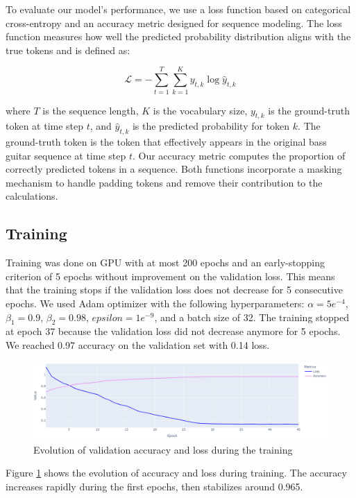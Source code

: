 To evaluate our model's performance, we use a loss function based on categorical cross-entropy and an accuracy metric designed for sequence modeling.
The loss function measures how well the predicted probability distribution aligns with the true tokens and is defined as:  

\begin{equation} \label{eq:loss}
    \mathcal{L} = - \sum_{t=1}^{T} \sum_{k=1}^{K} y_{t,k} \log \hat{y}_{t,k}
\end{equation}
    
where \( T \) is the sequence length, \( K \) is the vocabulary size, \( y_{t,k} \) is the ground-truth token at time step \( t \), and \( \hat{y}_{t,k} \) is the predicted probability for token \( k \).
The ground-truth token is the token that effectively appears in the original bass guitar sequence at time step \( t \).
Our accuracy metric computes the proportion of correctly predicted tokens in a sequence.
Both functions incorporate a masking mechanism to handle padding tokens and remove their contribution to the calculations.


\subsection{Training}

Training was done on GPU with at most 200 epochs and an early-stopping criterion of 5 epochs without improvement on the validation loss.
This means that the training stops if the validation loss does not decrease for 5 consecutive epochs.
We used Adam optimizer with the following hyperparameters: $\alpha=5e^{-4}$, $\beta_1=0.9$, $\beta_2=0.98$, $epsilon=1e^{-9}$, and a batch size of 32.
The training stopped at epoch 37 because the validation loss did not decrease anymore for 5 epochs.
We reached 0.97 accuracy on the validation set with 0.14 loss.

\begin{figure}[!ht]
    \centering
    \includegraphics[width=.8\linewidth]{../images-figures/validation_acc_loss.png}
    \caption{Evolution of validation accuracy and loss during the training}
    \label{fig:validation_acc_loss}
\end{figure}

Figure \ref{fig:validation_acc_loss} shows the evolution of accuracy and loss during training.
The accuracy increases rapidly during the first epochs, then stabilizes around 0.965.